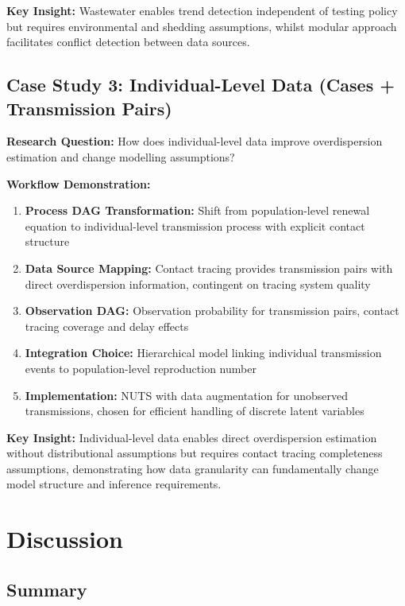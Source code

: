 \documentclass{article}
\begin{document}
\textbf{Key Insight:} Wastewater enables trend detection independent of testing policy but requires environmental and shedding assumptions, whilst modular approach facilitates conflict detection between data sources.

\subsection{Case Study 3: Individual-Level Data (Cases + Transmission Pairs)}

\textbf{Research Question:} How does individual-level data improve overdispersion estimation and change modelling assumptions?

\textbf{Workflow Demonstration:}
\begin{enumerate}
    \item \textbf{Process DAG Transformation:} Shift from population-level renewal equation to individual-level transmission process with explicit contact structure
    \item \textbf{Data Source Mapping:} Contact tracing provides transmission pairs with direct overdispersion information, contingent on tracing system quality
    \item \textbf{Observation DAG:} Observation probability for transmission pairs, contact tracing coverage and delay effects
    \item \textbf{Integration Choice:} Hierarchical model linking individual transmission events to population-level reproduction number
    \item \textbf{Implementation:} NUTS with data augmentation for unobserved transmissions, chosen for efficient handling of discrete latent variables
\end{enumerate}

\textbf{Key Insight:} Individual-level data enables direct overdispersion estimation without distributional assumptions but requires contact tracing completeness assumptions, demonstrating how data granularity can fundamentally change model structure and inference requirements.

\section{Discussion}

\subsection{Summary}
\end{document}
